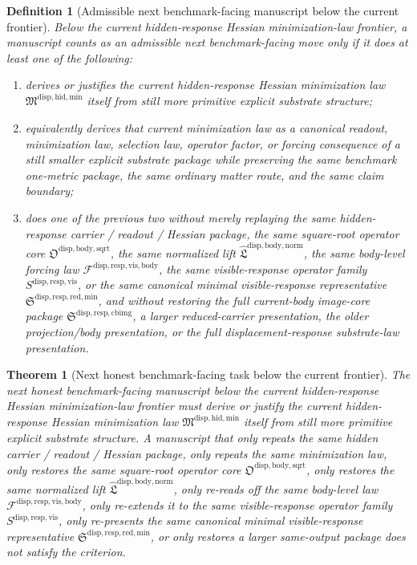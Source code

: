 \documentclass[11pt]{article}
\newcommand{\HiddenMinimizationPackage}{\mathfrak M^{\mathrm{disp,hid,min}}}
\newcommand{\SquareRootOperatorCore}{\mathfrak O^{\mathrm{disp,body,sqrt}}}
\newcommand{\NormalizedLiftPackage}{\widehat{\mathfrak L}^{\mathrm{disp,body,norm}}}
\newcommand{\VisibleBodyForcingLaw}{\mathscr F^{\mathrm{disp,resp,vis,body}}}
\newcommand{\VisibleResponseOperator}{S^{\mathrm{disp,resp,vis}}}
\newcommand{\MinimalReducedStructure}{\mathfrak S^{\mathrm{disp,resp,red,min}}}
\newcommand{\CurrentBodyImageCore}{\mathfrak S^{\mathrm{disp,resp,cbimg}}}
\newtheorem{definition}{Definition}
\newtheorem{theorem}{Theorem}
\begin{document}
\begin{definition}[Admissible next benchmark-facing manuscript below the current frontier]
Below the current hidden-response Hessian minimization-law frontier, a manuscript counts as an admissible next benchmark-facing move only if it does at least one of the following:
\begin{enumerate}
    \item derives or justifies the current hidden-response Hessian minimization law \(\HiddenMinimizationPackage\) itself from still more primitive explicit substrate structure;
    \item equivalently derives that current minimization law as a canonical readout, minimization law, selection law, operator factor, or forcing consequence of a still smaller explicit substrate package while preserving the same benchmark one-metric package, the same ordinary matter route, and the same claim boundary;
    \item does one of the previous two without merely replaying the same hidden-response carrier / readout / Hessian package, the same square-root operator core \(\SquareRootOperatorCore\), the same normalized lift \(\NormalizedLiftPackage\), the same body-level forcing law \(\VisibleBodyForcingLaw\), the same visible-response operator family \(\VisibleResponseOperator\), or the same canonical minimal visible-response representative \(\MinimalReducedStructure\), and without restoring the full current-body image-core package \(\CurrentBodyImageCore\), a larger reduced-carrier presentation, the older projection/body presentation, or the full displacement-response substrate-law presentation.
\end{enumerate}
\end{definition}

\begin{theorem}[Next honest benchmark-facing task below the current frontier]
The next honest benchmark-facing manuscript below the current hidden-response Hessian minimization-law frontier must derive or justify the current hidden-response Hessian minimization law \(\HiddenMinimizationPackage\) itself from still more primitive explicit substrate structure. A manuscript that only repeats the same hidden carrier / readout / Hessian package, only repeats the same minimization law, only restores the same square-root operator core \(\SquareRootOperatorCore\), only restores the same normalized lift \(\NormalizedLiftPackage\), only re-reads off the same body-level law \(\VisibleBodyForcingLaw\), only re-extends it to the same visible-response operator family \(\VisibleResponseOperator\), only re-presents the same canonical minimal visible-response representative \(\MinimalReducedStructure\), or only restores a larger same-output package does not satisfy the criterion.
\end{theorem}
\end{document}
